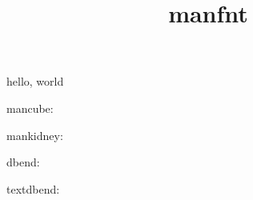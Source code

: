 \documentclass{amsart}
\title{manfnt}
\begin{document}
\maketitle

hello, world

mancube: \mancube

mankidney: \mankidney

dbend: \dbend

textdbend: \textdbend
\end{document}
